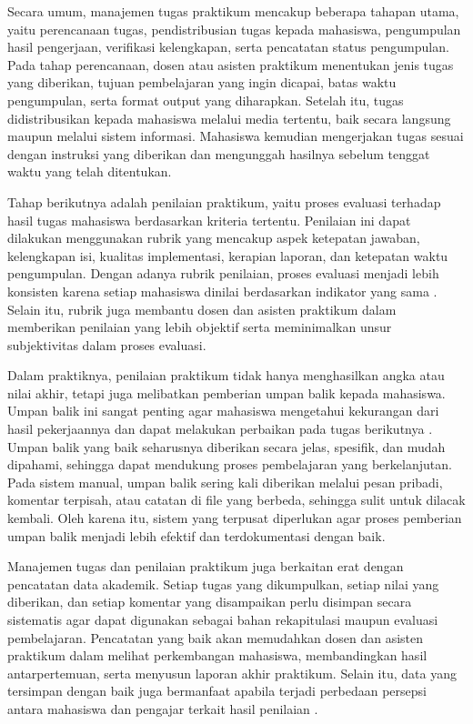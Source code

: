 \documentclass[12pt,a4paper,twoside]{report}
\begin{document}
Secara umum, manajemen tugas praktikum mencakup beberapa tahapan utama, yaitu perencanaan tugas, pendistribusian tugas kepada mahasiswa, pengumpulan hasil pengerjaan, verifikasi kelengkapan, serta pencatatan status pengumpulan. Pada tahap perencanaan, dosen atau asisten praktikum menentukan jenis tugas yang diberikan, tujuan pembelajaran yang ingin dicapai, batas waktu pengumpulan, serta format output yang diharapkan. Setelah itu, tugas didistribusikan kepada mahasiswa melalui media tertentu, baik secara langsung maupun melalui sistem informasi. Mahasiswa kemudian mengerjakan tugas sesuai dengan instruksi yang diberikan dan mengunggah hasilnya sebelum tenggat waktu yang telah ditentukan.

Tahap berikutnya adalah penilaian praktikum, yaitu proses evaluasi terhadap hasil tugas mahasiswa berdasarkan kriteria tertentu. Penilaian ini dapat dilakukan menggunakan rubrik yang mencakup aspek ketepatan jawaban, kelengkapan isi, kualitas implementasi, kerapian laporan, dan ketepatan waktu pengumpulan. Dengan adanya rubrik penilaian, proses evaluasi menjadi lebih konsisten karena setiap mahasiswa dinilai berdasarkan indikator yang sama \cite{dawson2017}. Selain itu, rubrik juga membantu dosen dan asisten praktikum dalam memberikan penilaian yang lebih objektif serta meminimalkan unsur subjektivitas dalam proses evaluasi.

Dalam praktiknya, penilaian praktikum tidak hanya menghasilkan angka atau nilai akhir, tetapi juga melibatkan pemberian umpan balik kepada mahasiswa. Umpan balik ini sangat penting agar mahasiswa mengetahui kekurangan dari hasil pekerjaannya dan dapat melakukan perbaikan pada tugas berikutnya \cite{nicol2006}. Umpan balik yang baik seharusnya diberikan secara jelas, spesifik, dan mudah dipahami, sehingga dapat mendukung proses pembelajaran yang berkelanjutan. Pada sistem manual, umpan balik sering kali diberikan melalui pesan pribadi, komentar terpisah, atau catatan di file yang berbeda, sehingga sulit untuk dilacak kembali. Oleh karena itu, sistem yang terpusat diperlukan agar proses pemberian umpan balik menjadi lebih efektif dan terdokumentasi dengan baik.

Manajemen tugas dan penilaian praktikum juga berkaitan erat dengan pencatatan data akademik. Setiap tugas yang dikumpulkan, setiap nilai yang diberikan, dan setiap komentar yang disampaikan perlu disimpan secara sistematis agar dapat digunakan sebagai bahan rekapitulasi maupun evaluasi pembelajaran. Pencatatan yang baik akan memudahkan dosen dan asisten praktikum dalam melihat perkembangan mahasiswa, membandingkan hasil antarpertemuan, serta menyusun laporan akhir praktikum. Selain itu, data yang tersimpan dengan baik juga bermanfaat apabila terjadi perbedaan persepsi antara mahasiswa dan pengajar terkait hasil penilaian \cite{romero2020}.
\end{document}
